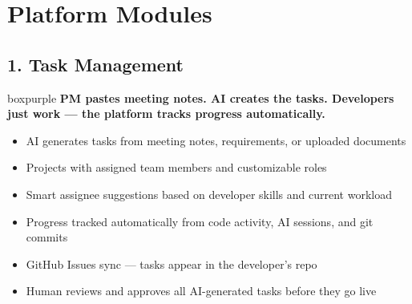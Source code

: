 \documentclass[12pt,a4paper]{article}
\begin{document}
\newpage
\section{Platform Modules}

\subsection{1. Task Management}

\begin{hookbox}{boxpurple}
\textbf{PM pastes meeting notes. AI creates the tasks. Developers just work --- the platform tracks progress automatically.}
\end{hookbox}

\begin{itemize}[nosep]
    \item AI generates tasks from meeting notes, requirements, or uploaded documents
    \item Projects with assigned team members and customizable roles
    \item Smart assignee suggestions based on developer skills and current workload
    \item Progress tracked automatically from code activity, AI sessions, and git commits
    \item GitHub Issues sync --- tasks appear in the developer's repo
    \item Human reviews and approves all AI-generated tasks before they go live
\end{itemize}

\begin{center}
\end{center}
\end{document}
